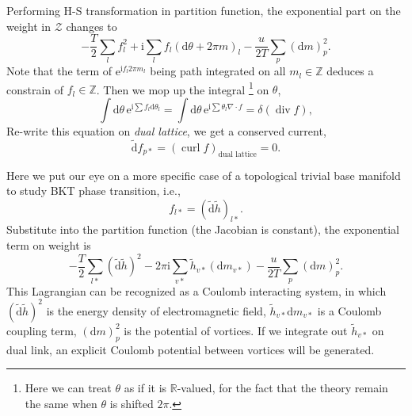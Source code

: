 Performing H-S transformation in partition function, the exponential part on the weight in $\mathcal{Z}$ changes to
\begin{equation}
  -\frac{T}{2} \sum_{l} f_l^{2} + \mathrm{i} \sum_{l} f_l \left( \mathrm{d} \theta + 2\pi  m \right)_{l} - \frac{u}{2T} \sum_{p} \left( \mathrm{d} m \right)_{p}^{2}.
\end{equation}
Note that the term of $\mathrm{e}^{\mathrm{i} f_l 2\pi m_l}$ being path integrated on all $m_l \in \mathbb{Z}$ deduces a constrain of $f_l \in \mathbb{Z}$. Then we mop up the integral \footnote{Here we can treat $\theta$ as if it is $\mathbb{R}$-valued, for the fact that the theory remain the same when $\theta$ is shifted $2\pi $.} on $\theta$,
\begin{equation}
  \int \mathrm{d} \theta \, \mathrm{e}^{ \mathrm{i}\sum f_l \mathrm{d} \theta_{l}} = \int \mathrm{d} \theta \, \mathrm{e}^{\mathrm{i} \sum \theta_{l} \nabla \cdot f} = \delta\left( \operatorname{div} f \right),
\end{equation}
Re-write this equation on \emph{dual lattice}, we get a conserved current,
\begin{equation}
  \tilde{\mathrm{d}} f_{p*} = \left( \operatorname{curl} f \right)_{\text{dual lattice}} = 0.
\end{equation}

Here we put our eye on a more specific case of a topological trivial base manifold to study BKT phase transition, i.e.,
\begin{equation}
  f_{l*} = \left( \tilde{\mathrm{d}} \tilde{h} \right)_{l*}.
\end{equation}
Substitute into the partition function (the Jacobian is constant), the exponential term on weight is
\begin{equation}\label{eq:lagrangian-of-coulomb}
  - \frac{T}{2} \sum_{l*} \left( \tilde{\mathrm{d}} \tilde{h} \right)^{2} - 2\pi  \mathrm{i} \sum_{v*} \tilde{h}_{v*} \left( \mathrm{d} m_{v*} \right) - \frac{u}{2T} \sum_{p} \left( \mathrm{d} m \right)_{p}^{2}.
\end{equation}
This Lagrangian can be recognized as a Coulomb interacting system, in which $\left( \tilde{\mathrm{d} } \tilde{h} \right)^{2}$ is the energy density of electromagnetic field, $\tilde{h}_{v*} \mathrm{d} m_{v*}$ is a Coulomb coupling term, $\left( \mathrm{d} m \right)_{p}^{2}$ is the potential of vortices.
If we integrate out $\tilde{h}_{v*}$ on dual link, an explicit Coulomb potential between vortices will be generated.

